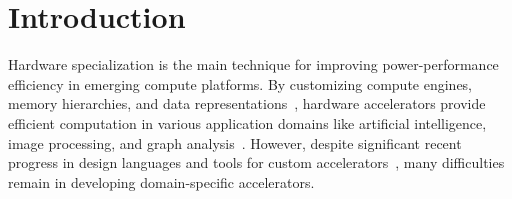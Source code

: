 \section{Introduction}
\label{sec.intro}


Hardware specialization 
  is the main technique 
  for improving power-performance efficiency in emerging compute platforms.
By customizing 
  compute engines, memory hierarchies, and data representations~\cite{chan2014itrs,fang2019understanding,lai2021programming},
  hardware accelerators provide 
  efficient computation in various application domains 
  like artificial intelligence, image processing, and graph analysis~\cite{han2016eie,chen2016eyeriss,reagen2016minerva,zhang2016cambricon,hameed2010understanding,ham2016graphicionado}.
However,
  despite significant recent progress in 
  design languages and tools for
  custom accelerators~\cite{nigam2021calyx, lai2019heterocl},
  many difficulties remain in
  developing domain-specific accelerators.

